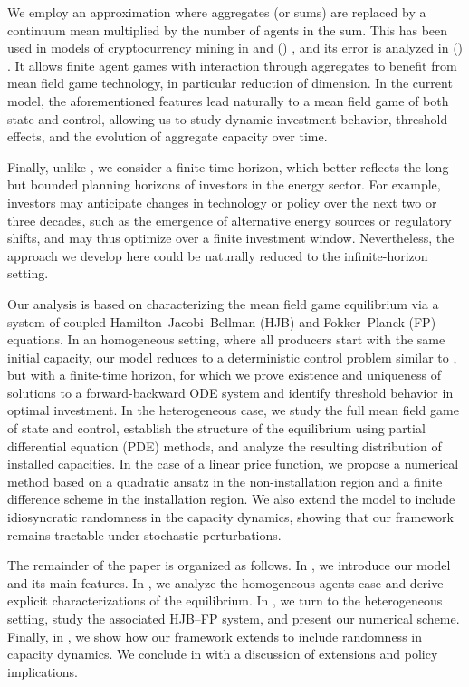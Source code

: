 \documentclass[12pt]{article}
\newcommand\citeayn[2][]{\citeauthor*{#2} (\citeyear{#2}) \cite[#1]{#2}}
\begin{document}
We employ an approximation where aggregates (or sums) are replaced by a continuum mean multiplied by the number of agents in the sum. This has been used in models of cryptocurrency mining in \cite{li2024mean} and \citeayn{garcia_crypto}, and its error is analyzed in \citeayn{cags}.  It allows finite agent games with interaction through aggregates to benefit from mean field game technology, in particular reduction of dimension. In the current model, 
the aforementioned features lead naturally to a mean field game of both state and control, allowing us to study dynamic investment behavior, threshold effects, and the evolution of aggregate capacity over time. 

Finally, unlike \cite{alasseur2023mean}, we consider a finite time horizon, which better reflects the long but bounded planning horizons of investors in the energy sector. For example, investors may anticipate changes in technology or policy over the next two or three decades, such as the emergence of alternative energy sources or regulatory shifts, and may thus optimize over a finite investment window. Nevertheless, the approach we develop here could be naturally reduced to the infinite-horizon setting.


Our analysis is based on characterizing the mean field game equilibrium via a system of coupled Hamilton--Jacobi--Bellman (HJB) and Fokker--Planck (FP) equations. In an homogeneous setting, where all producers start with the same initial capacity, our model reduces to a deterministic control problem similar to \cite{alasseur2023mean}, but with a finite-time horizon, for which we prove existence and uniqueness of solutions to a forward-backward ODE system and identify threshold behavior in optimal investment. In the heterogeneous case, we study the full mean field game of state and control, establish the structure of the equilibrium using partial differential equation (PDE) methods, and analyze the resulting distribution of installed capacities. In the case of a linear price function, we propose a numerical method based on a quadratic ansatz in the non-installation region and a finite difference scheme in the installation region. We also extend the model to include idiosyncratic randomness in the capacity dynamics, showing that our framework remains tractable under stochastic perturbations. 




The remainder of the paper is organized as follows. In , we introduce our model and its main features. In , we analyze the homogeneous agents case and derive explicit characterizations of the equilibrium. In , we turn to the heterogeneous setting, study the associated HJB--FP system, and present our numerical scheme. Finally, in , we show how our framework extends to include randomness in capacity dynamics. We conclude in  with a discussion of extensions and policy implications.
\end{document}
